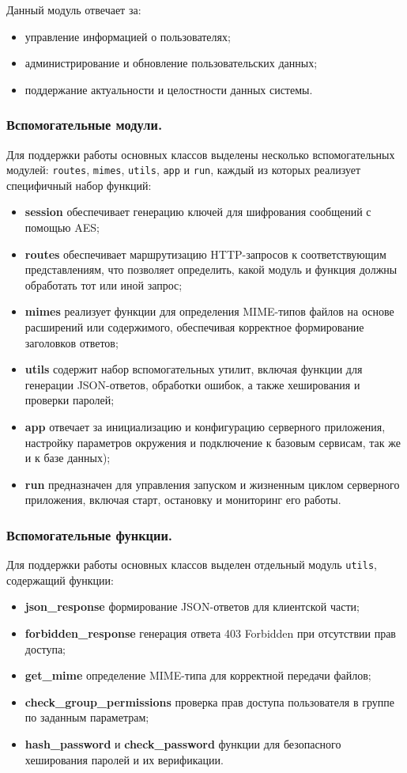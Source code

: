 Данный модуль отвечает за:

\begin{itemize}
	\item управление информацией о пользователях;
	\item администрирование и обновление пользовательских данных;
	\item поддержание актуальности и целостности данных системы.
\end{itemize}


\subsubsection{Вспомогательные модули.}
Для поддержки работы основных классов выделены несколько вспомогательных модулей: \texttt{routes}, \texttt{mimes}, \texttt{utils}, \texttt{app} и \texttt{run}, каждый из которых реализует специфичный набор функций:
\begin{itemize}
	\item \textbf{session} обеспечивает генерацию ключей для шифрования сообщений с помощью AES;
	\item \textbf{routes} обеспечивает маршрутизацию HTTP-запросов к соответствующим представлениям, что позволяет определить, какой модуль и функция должны обработать тот или иной запрос;
	\item \textbf{mimes} реализует функции для определения MIME-типов файлов на основе расширений или содержимого, обеспечивая корректное формирование заголовков ответов;
	\item \textbf{utils} содержит набор вспомогательных утилит, включая функции для генерации JSON-ответов, обработки ошибок, а также хеширования и проверки паролей;
	\item \textbf{app} отвечает за инициализацию и конфигурацию серверного приложения, настройку параметров окружения и подключение к базовым сервисам, так же и к базе данных);
	\item \textbf{run} предназначен для управления запуском и жизненным циклом серверного приложения, включая старт, остановку и мониторинг его работы.
\end{itemize}


\subsubsection{Вспомогательные функции.}
Для поддержки работы основных классов выделен отдельный модуль \texttt{utils}, содержащий функции:
\begin{itemize}
	\item \textbf{json\_response} формирование JSON-ответов для клиентской части;
	\item \textbf{forbidden\_response} генерация ответа 403 Forbidden при отсутствии прав доступа;
	\item \textbf{get\_mime} определение MIME-типа для корректной передачи файлов;
	\item \textbf{check\_group\_permissions} проверка прав доступа пользователя в группе по заданным параметрам;
	\item \textbf{hash\_password} и \textbf{check\_password} функции для безопасного хеширования паролей и их верификации.
\end{itemize}

